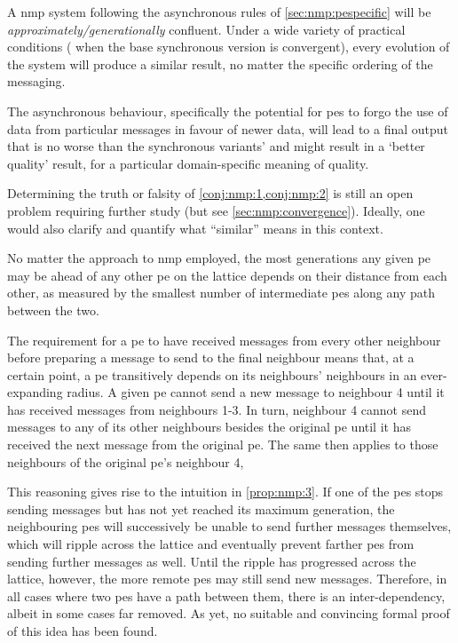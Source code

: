 \begin{conjecture}\label{conj:nmp:1}
A \gls{nmp} system following the asynchronous rules of \cref{sec:nmp:pespecific} will be \emph{approximately/generationally} confluent.  Under a wide variety of practical conditions (\eg{} when the base synchronous version is convergent), every evolution of the system will produce a similar result, no matter the specific ordering of the messaging.
\end{conjecture}

\begin{conjecture}\label{conj:nmp:2}
    The asynchronous behaviour, specifically the potential for \glspl{pe} to forgo the use of data from particular messages in favour of newer data, will lead to a final output that is no worse than the synchronous variants' and might result in a `better quality' result, for a particular domain-specific meaning of quality.
\end{conjecture}

Determining the truth or falsity of \cref{conj:nmp:1,conj:nmp:2} is still an open problem requiring further study (but see \cref{sec:nmp:convergence}).  Ideally, one would also clarify and quantify what ``similar'' means in this context.

\begin{proposition}\label{prop:nmp:3}
    No matter the approach to \gls{nmp} employed, the most generations any given \gls{pe} may be ahead of any other \gls{pe} on the lattice depends on their distance from each other, as measured by the smallest number of intermediate \glspl{pe} along any path between the two.
\end{proposition}

The requirement for a \gls{pe} to have received messages from every other neighbour before preparing a message to send to the final neighbour means that, at a certain point, a \gls{pe} transitively depends on its neighbours' neighbours in an ever-expanding radius.  A given \gls{pe} cannot send a new message to neighbour 4 until it has received messages from neighbours 1-3.  In turn, neighbour 4 cannot send messages to any of its other neighbours besides the original \gls{pe} until it has received the next message from the original \gls{pe}.  The same then applies to those neighbours of the original \gls{pe}'s neighbour 4, \etc{}

This reasoning gives rise to the intuition in \cref{prop:nmp:3}.  If one of the \glspl{pe} stops sending messages but has not yet reached its maximum generation, the neighbouring \glspl{pe} will successively be unable to send further messages themselves, which will ripple across the lattice and eventually prevent farther \glspl{pe} from sending further messages as well.  Until the ripple has progressed across the lattice, however, the more remote \glspl{pe} may still send new messages.  Therefore, in all cases where two \glspl{pe} have a path between them, there is an inter-dependency, albeit in some cases far removed.  As yet, no suitable and convincing formal proof of this idea has been found.

